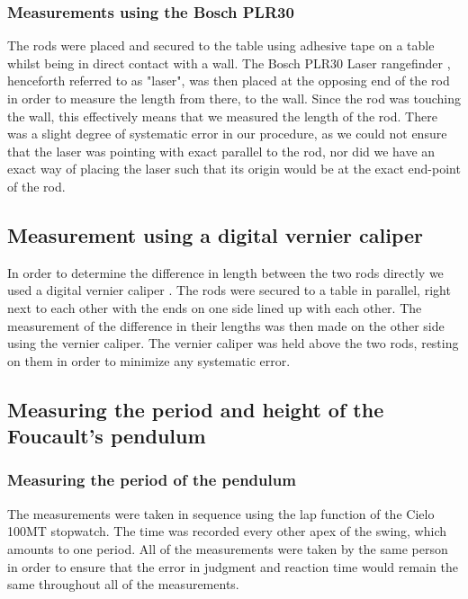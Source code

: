 \documentclass[11pt,a4paper]{article}
\begin{document}
    \subsubsection{Measurements using the Bosch PLR30}
      The rods were placed and secured to the table using adhesive tape on a table whilst being in direct contact with a wall. The Bosch PLR30 Laser rangefinder \cite{PLR}, henceforth referred to as "laser", was then placed at the opposing end of the rod in order to measure the length from there, to the wall. Since the rod was touching the wall, this effectively means that we measured the length of the rod. There was a slight degree of systematic error in our procedure, as we could not ensure that the laser was pointing with exact parallel to the rod, nor did we have an exact way of placing the laser such that its origin would be at the exact end-point of the rod. 

    \subsection{Measurement using a digital vernier caliper}
      In order to determine the difference in length between the two rods directly we used a digital vernier caliper \cite{cocraft}. The rods were secured to a table in parallel, right next to each other with the ends on one side lined up with each other. The measurement of the difference in their lengths was then made on the other side using the vernier caliper. The vernier caliper was held above the two rods, resting on them in order to minimize any systematic error.

  \subsection{Measuring the period and height of the Foucault's pendulum}

    \subsubsection{\label{subsect:exp_period}Measuring the period of the pendulum}
    The measurements were taken in sequence using the lap function of the Cielo 100MT \cite{cielo} stopwatch. The time was recorded every other apex of the swing, which amounts to one period. All of the measurements were taken by the same person in order to ensure that the error in judgment and reaction time would remain the same throughout all of the measurements.
\end{document}

